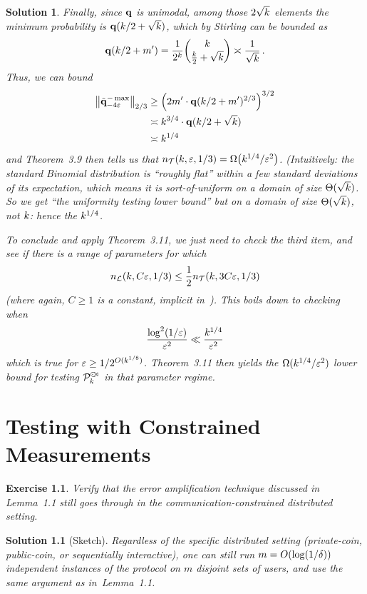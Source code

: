 \documentclass[biber,plain]{nowfnt} %
\newtheorem{question}{Exercise}[chapter]
\newtheorem{solution}{Solution}[chapter]
\begin{document}
\begin{solution}
Finally, since $\mathbf{q}$ is unimodal, among those $2\sqrt{k}$ elements the minimum probability is $\mathbf{q}(k/2+\sqrt{k})$, which by Stirling can be bounded as
\[
	\mathbf{q}(k/2+m') = \frac{1}{2^k} \binom{k}{\frac{k}{2}+\sqrt{k}} \asymp \frac{1}{\sqrt{k}}  \,.
\]
Thus, we can bound
\begin{align*}
	\norm{\tilde{\q}^{-\max}_{-4\dst}}_{2/3} 
	&\geq \Paren{ 2m'\cdot \q(\ab/2+m')^{2/3} }^{3/2}  \\
	&\asymp \ab^{3/4} \cdot \q(\ab/2+\sqrt{\ab})  \\
	&\asymp \ab^{1/4}
\end{align*}
and Theorem~3.9 then tells us that $\ns_{\mathcal{T}}(\ab,\dst,1/3) = \bigOmega{\ab^{1/4}/\dst^2}$. \emph{(Intuitively: the standard Binomial distribution is ``roughly flat'' within a few standard deviations of its expectation, which means it is sort-of-uniform on a domain of size $\Theta(\sqrt{k})$. So we get ``the uniformity testing lower bound'' but on a domain of size $\Theta(\sqrt{k})$, not $k$: hence the $k^{1/4}$.}

To conclude and apply Theorem~3.11, we just need to check the third item, and see if there is a range of parameters for which
\[
		n_{\mathcal{L}}(k,C\varepsilon,1/3)  \leq \frac{1}{2}n_{\mathcal{T}}(k,3C\varepsilon,1/3) 
\]
(where again, $C\geq 1$ is a constant, implicit in~\citep{DDS:PBD:15}). This boils down to checking when
\[
		\frac{\log^2(1/\varepsilon)}{\varepsilon^2} \ll \frac{k^{1/4}}{\varepsilon^2}
\]
which is true for $\varepsilon \geq 1/2^{O(k^{1/8})}$.  Theorem~3.11 then yields the $\Omega(k^{1/4}/\varepsilon^2)$ lower bound for testing $\mathcal{P}^{\hspace{1pt}{\cdot}\kern -4pt {\subset}\kern -3pt {\rtimes}}_{k}$ in that parameter regime. 
\end{solution}

\chapter{Testing with Constrained Measurements}
  \label{chap:constrained}
  
  \begin{question}\label{exo:error:amplification}
Verify that the error amplification technique discussed in Lemma~1.1 still goes through in the communication-constrained distributed setting.
\end{question}
\begin{solution}[Sketch]
Regardless of the specific distributed setting (private-coin, public-coin, or sequentially interactive), one can still run $m=\bigO{\log(1/\errprob)}$ independent instances of the protocol on $m$ disjoint sets of users, and use the same argument as in~Lemma~1.1.
\end{solution}
\end{document}
